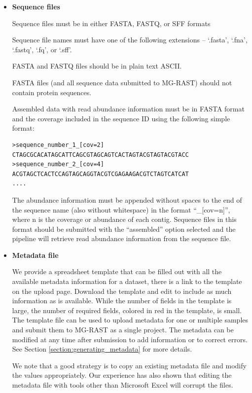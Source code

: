 \documentclass[12pt,fullpage]{report}
\begin{document}
\begin{itemize}
\item {\bf Sequence files}

Sequence files must be in either FASTA, FASTQ, or SFF formats

Sequence file names must have one of the following extensions -- `.fasta', `.fna', `.fastq', `.fq', or `.sff'.

FASTA and FASTQ files should be in plain text ASCII.

FASTA files (and all sequence data submitted to MG-RAST) should not contain protein sequences.

Assembled data with read abundance information must be in FASTA format and the coverage included in the sequence ID using the following simple format:
\begin{verbatim}
>sequence_number_1_[cov=2]
CTAGCGCACATAGCATTCAGCGTAGCAGTCACTAGTACGTAGTACGTACC
>sequence_number_2_[cov=4]
ACGTAGCTCACTCCAGTAGCAGGTACGTCGAGAAGACGTCTAGTCATCAT
....
\end{verbatim}

The abundance information must be appended without spaces to the end of the sequence name (also without whitespace) in the format ``\_[cov=n]'', where n is the coverage or abundance of each contig.
Sequence files in this format should be submitted with the ``assembled'' option selected and the pipeline will retrieve read abundance information from the sequence file.

\item {\bf Metadata file}

We provide a spreadsheet template that can be filled out with all the available metadata information for a dataset, there is a link to the template on the upload page. Download the template and edit to include as much information as is available. While the number of fields in the template is large, the number of required fields, colored in red in the template, is small. The template file can be used to upload metadata for one or multiple samples and submit them to MG-RAST as a single project. The metadata can be modified at any time after submission to add information or to correct errors. See Section \ref{section:generating_metadata} for more details.

We note that a good strategy is to copy an existing metadata file and modify the values appropriately. Our experience has also shown that editing the metadata file with tools other than Microsoft Excel will corrupt the files.



\end{itemize}
\end{document}
